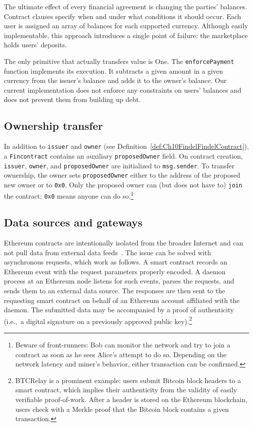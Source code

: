 The ultimate effect of every financial agreement is changing the parties' balances.
Contract clauses specify when and under what conditions it should occur.
Each user is assigned an array of balances for each supported currency.
Although easily implementable, this approach introduces a single point of failure: the marketplace holds users' deposits.

The only primitive that actually transfers value is \(\mathrm{One}\).
The \texttt{enforcePayment} function implements its execution.
It subtracts a given amount in a given currency from the issuer's balance and adds it to the owner's balance.
Our current implementation does not enforce any constraints on users' balances and does not prevent them from building up debt.


\subsection{Ownership transfer}

In addition to \texttt{issuer} and \texttt{owner} (see Definition~\ref{def:Ch10FindelFindelContract}), a \texttt{Fincontract} contains an auxiliary \texttt{proposedOwner} field.
On contract creation, \texttt{issuer}, \texttt{owner}, and \texttt{proposedOwner} are initialized to \texttt{msg.sender}.
To transfer ownership, the owner sets \texttt{proposedOwner} either to the address of the proposed new owner or to \texttt{0x0}.
Only the proposed owner can (but does not have to) \texttt{join} the contract; \texttt{0x0} means anyone can do so.\footnote{Beware of front-runners: Bob can monitor the network and try to join a contract as soon as he sees Alice's attempt to do so. Depending on the network latency and miner's behavior, either transaction can be confirmed.}


\subsection{Data sources and gateways} \label{def:Ch10FindelGateways}

Ethereum contracts are intentionally isolated from the broader Internet and can not pull data from external data feeds~\cite{Greenspan2016}.
The issue can be solved with asynchronous requests, which work as follows.
A smart contract records an Ethereum event with the request parameters properly encoded.
A daemon process at an Ethereum node listens for such events, parses the requests, and sends them to an external data source.
The responses are then sent to the requesting smart contract on behalf of an Ethereum account affiliated with the daemon.
The submitted data may be accompanied by a proof of authenticity (i.e.,~a digital signature on a previously approved public key).\footnote{BTCRelay is a prominent example: users submit Bitcoin block headers to a smart contract, which implies their authenticity from the validity of easily verifiable proof-of-work. After a header is stored on the Ethereum blockchain, users check with a Merkle proof that the Bitcoin block contains a given transaction.}


